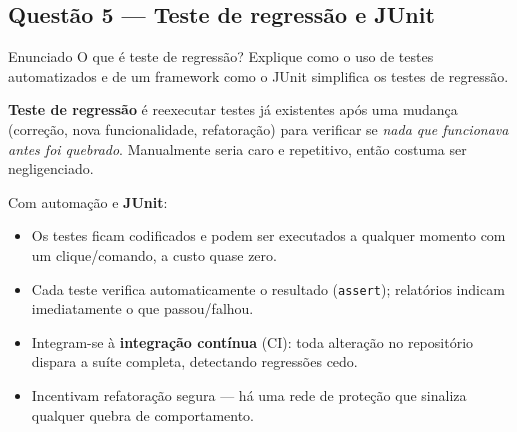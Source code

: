 \documentclass[11pt,a4paper]{article}
\begin{document}
\subsection*{Questão 5 — Teste de regressão e JUnit}
\begin{questao}{Enunciado}
O que é teste de regressão? Explique como o uso de testes automatizados e de um
framework como o JUnit simplifica os testes de regressão.
\end{questao}
\begin{resposta}
\textbf{Teste de regressão} é reexecutar testes já existentes após uma mudança
(correção, nova funcionalidade, refatoração) para verificar se \emph{nada que
funcionava antes foi quebrado}. Manualmente seria caro e repetitivo, então
costuma ser negligenciado.

Com automação e \textbf{JUnit}:
\begin{itemize}[nosep]
  \item Os testes ficam codificados e podem ser executados a qualquer momento
        com um clique/comando, a custo quase zero.
  \item Cada teste verifica automaticamente o resultado (\texttt{assert});
        relatórios indicam imediatamente o que passou/falhou.
  \item Integram-se à \textbf{integração contínua} (CI): toda alteração no
        repositório dispara a suíte completa, detectando regressões cedo.
  \item Incentivam refatoração segura — há uma rede de proteção que sinaliza
        qualquer quebra de comportamento.
\end{itemize}
\end{resposta}

\end{document}
